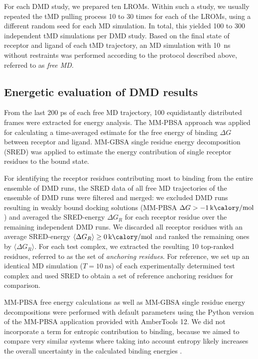 For each DMD study, we prepared ten LROMs. Within such a study, we usually
repeated the tMD pulling process 10 to 30 times for each of the LROMs, using a
different random seed for each MD simulation. In total, this yielded 100 to 300
independent tMD simulations per DMD study. Based on the final state of receptor
and ligand of each tMD trajectory, an MD simulation with \SI{10}{\nano\second}
without restraints was performed according to the protocol described above,
referred to as \textit{free MD}.


\subsection{Energetic evaluation of DMD results}


From the last 200 ps of each free MD trajectory, 100 equidistantly distributed
frames were extracted for energy analysis. The MM-PBSA \cite{mmpbsa_py} approach
was applied for calculating a time-averaged estimate for the free energy of
binding $\Delta G$ between receptor and ligand. MM-GBSA \cite{mmpbsa_py} single
residue energy decomposition (SRED) was applied to estimate the energy
contribution of single receptor residues to the bound state.

For identifying the receptor residues contributing most to binding from the
entire ensemble of DMD runs, the SRED data of all free MD trajectories of the
ensemble of DMD runs were filtered and merged: we excluded DMD runs resulting in
weakly bound docking solutions (MM-PBSA $\Delta G >
\SI{-1}{\kilo\calory\per\mole} $) and averaged the SRED-energy $\Delta G_R$ for
each receptor residue over the remaining independent DMD runs. We discarded all
receptor residues with an average SRED-energy $\langle\Delta G_R\rangle \ge
\SI{0}{\kilo\calory\per\mole}$ and ranked the remaining ones by $\langle\Delta
G_R\rangle$. For each test complex, we extracted the resulting 10 top-ranked
residues, referred to as the set of \textit{anchoring residues}. For reference,
we set up an identical MD simulation ($T=\SI{10}{\nano\second}$) of each
experimentally determined test complex and used SRED to obtain a set of reference
anchoring residues for comparison.

MM-PBSA free energy calculations as well as MM-GBSA single residue energy
decompositions were performed with default parameters using the Python version
of the MM-PBSA application provided with AmberTools 12. We did not incorporate a
term for entropic contribution to binding, because we aimed to compare very
similar systems where taking into account entropy likely increases the overall
uncertainty in the calculated binding energies {\cite{Gandhi01102009,
homeyer_gohlke_2012}}.


